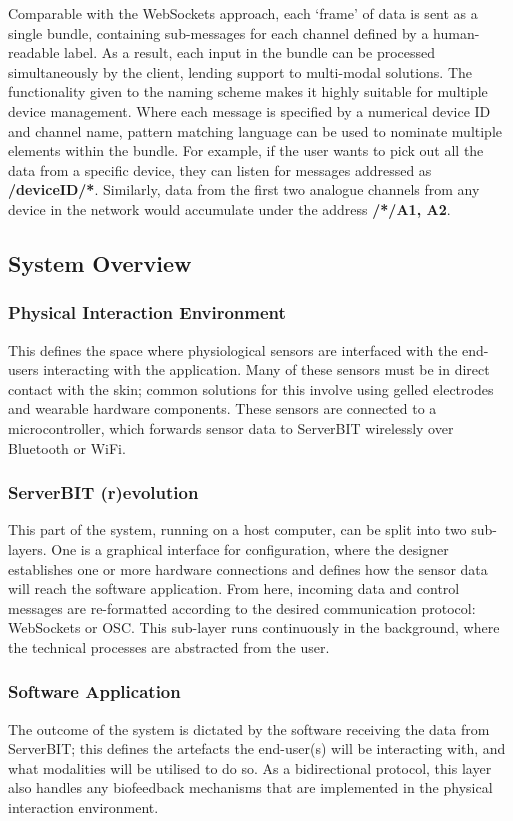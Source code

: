 Comparable with the WebSockets approach, each ‘frame’ of data is sent as a single bundle, containing sub-messages for each channel defined by a human-readable label. As a result, each input in the bundle can be processed simultaneously by the client, lending support to multi-modal solutions. The functionality given to the naming scheme makes it highly suitable for multiple device management. Where each message is specified by a numerical device ID and channel name, pattern matching language can be used to nominate multiple elements within the bundle. For example, if the user wants to pick out all the data from a specific device, they can listen for messages addressed as \textbf{/deviceID/*}. Similarly, data from the first two analogue channels from any device in the network would accumulate under the address \textbf{/*/{A1, A2}}.

\subsection{System Overview}

\subsubsection*{Physical Interaction Environment}
This defines the space where physiological sensors are interfaced with the end-users interacting with the application. Many of these sensors must be in direct contact with the skin; common solutions for this involve using gelled electrodes and wearable hardware components. These sensors are connected to a microcontroller, which forwards sensor data to ServerBIT wirelessly over Bluetooth or WiFi.

\subsubsection*{ServerBIT (r)evolution}
This part of the system, running on a host computer, can be split into two sub-layers. One is a graphical interface for configuration, where the designer establishes one or more hardware connections and defines how the sensor data will reach the software application. From here, incoming data and control messages are re-formatted according to the desired communication protocol: WebSockets or OSC. This sub-layer runs continuously in the background, where the technical processes are abstracted from the user.

\subsubsection*{Software Application}
The outcome of the system is dictated by the software receiving the data from ServerBIT; this defines the artefacts the end-user(s) will be interacting with, and what modalities will be utilised to do so.
As a bidirectional protocol, this layer also handles any biofeedback mechanisms that are implemented in the physical interaction environment.

